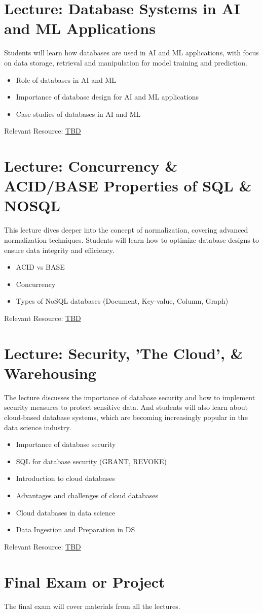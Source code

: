 \documentclass[11pt, letterpaper]{article}
\let\oldsection\section
\renewcommand\section{\clearpage\oldsection}
\begin{document}
	\section*{Lecture: Database Systems in AI and ML Applications}
	Students will learn how databases are used in AI and ML applications, with focus on data storage, retrieval and manipulation for model training and prediction.
	\begin{itemize}
		\item Role of databases in AI and ML
		\item Importance of database design for AI and ML applications
		\item Case studies of databases in AI and ML
	\end{itemize}
	Relevant Resource: \href{https://example.com}{TBD}
	
	\section*{Lecture: Concurrency \& ACID/BASE Properties of SQL \& NOSQL}
	This lecture dives deeper into the concept of normalization, covering advanced normalization techniques. Students will learn how to optimize database designs to ensure data integrity and efficiency.
	\begin{itemize}
		\item ACID vs BASE
		\item Concurrency
		\item Types of NoSQL databases (Document, Key-value, Column, Graph)
	\end{itemize}
	Relevant Resource: \href{https://example.com}{TBD}
	
	\section*{Lecture: Security, 'The Cloud', \& Warehousing}
	The lecture discusses the importance of database security and how to implement security measures to protect sensitive data. And students will also learn about cloud-based database systems, which are becoming increasingly popular in the data science industry.
	\begin{itemize}
		\item Importance of database security
		\item SQL for database security (GRANT, REVOKE)
		\item Introduction to cloud databases
		\item Advantages and challenges of cloud databases
		\item Cloud databases in data science
		\item Data Ingestion and Preparation in DS
	\end{itemize}
	Relevant Resource: \href{https://example.com}{TBD}
	
	
	\section*{Final Exam or Project}
	The final exam will cover materials from all the lectures.
\end{document}
